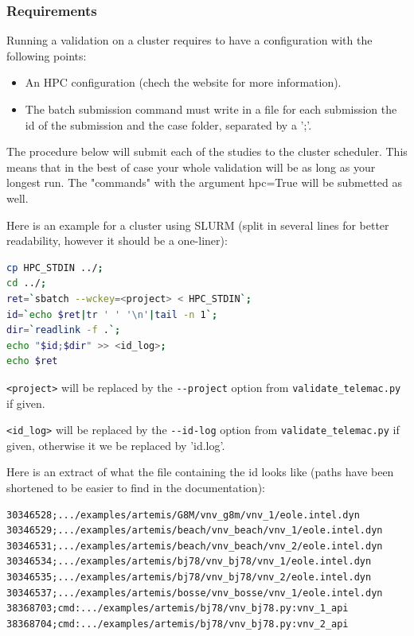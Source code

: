 \subsubsection{Requirements}

Running a validation on a cluster requires to have a configuration with the
following points:
\begin{itemize}
  \item An HPC configuration (chech the website for more information).
  \item The batch submission command must write in a file for each submission
    the id of the submission and the case folder, separated by a ';'.
\end{itemize}

The procedure below will submit each of the \telma{} studies to the cluster
scheduler. This means that in the best of case your whole validation will be as
long as your longest \telma{} run.
The "commands" with the argument hpc=True will be submetted as well.

Here is an example for a cluster using SLURM (split in several lines for better
readability, however it should be a one-liner):
\begin{lstlisting}[language=bash]
cp HPC_STDIN ../;
cd ../;
ret=`sbatch --wckey=<project> < HPC_STDIN`;
id=`echo $ret|tr ' ' '\n'|tail -n 1`;
dir=`readlink -f .`;
echo "$id;$dir" >> <id_log>;
echo $ret
\end{lstlisting}

\verb!<project>! will be replaced by the \verb!--project! option from
\verb!validate_telemac.py! if given.

\verb!<id_log>! will be replaced by the \verb!--id-log! option from
\verb!validate_telemac.py! if given, otherwise it we be replaced by 'id.log'.

Here is an extract of what the file containing the id looks like (paths have
been shortened to be easier to find in the documentation):
\begin{verbatim}
30346528;.../examples/artemis/G8M/vnv_g8m/vnv_1/eole.intel.dyn
30346529;.../examples/artemis/beach/vnv_beach/vnv_1/eole.intel.dyn
30346531;.../examples/artemis/beach/vnv_beach/vnv_2/eole.intel.dyn
30346534;.../examples/artemis/bj78/vnv_bj78/vnv_1/eole.intel.dyn
30346535;.../examples/artemis/bj78/vnv_bj78/vnv_2/eole.intel.dyn
30346537;.../examples/artemis/bosse/vnv_bosse/vnv_1/eole.intel.dyn
38368703;cmd:.../examples/artemis/bj78/vnv_bj78.py:vnv_1_api
38368704;cmd:.../examples/artemis/bj78/vnv_bj78.py:vnv_2_api
\end{verbatim}

